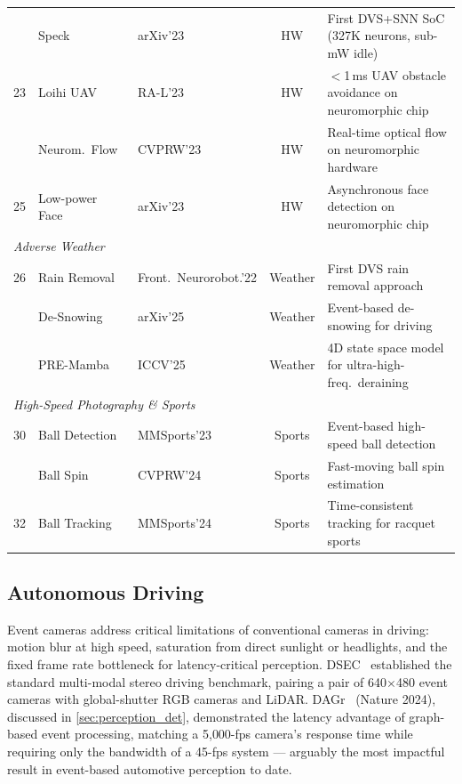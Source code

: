 \begin{table}[t]
{\begin{tabular}{rl l c l}
\midrule
\rowalt
22 & Speck~\cite{bauer2023speck} & arXiv'23 & HW & First DVS+SNN SoC (327K neurons, sub-mW idle) \\
23 & Loihi UAV~\cite{paredes2023neurochip} & RA-L'23 & HW & $<$1\,ms UAV obstacle avoidance on neuromorphic chip \\
\rowalt
24 & Neurom.~Flow~\cite{shiba2023neuromorphicof} & CVPRW'23 & HW & Real-time optical flow on neuromorphic hardware \\
25 & Low-power Face~\cite{li2023lowpowerface} & arXiv'23 & HW & Asynchronous face detection on neuromorphic chip \\
\midrule
\multicolumn{5}{l}{\textit{Adverse Weather}} \\
\midrule
26 & Rain Removal~\cite{jiang2022rainremoval} & Front.~Neurorobot.'22 & Weather & First DVS rain removal approach \\
\rowalt
28 & De-Snowing~\cite{zhang2025desnowing} & arXiv'25 & Weather & Event-based de-snowing for driving \\
\rowalt
29 & PRE-Mamba~\cite{li2025premamba} & ICCV'25 & Weather & 4D state space model for ultra-high-freq.\ deraining \\
\midrule
\multicolumn{5}{l}{\textit{High-Speed Photography \& Sports}} \\
\midrule
30 & Ball Detection~\cite{delamare2023balldetect} & MMSports'23 & Sports & Event-based high-speed ball detection \\
\rowalt
31 & Ball Spin~\cite{gao2024ballspin} & CVPRW'24 & Sports & Fast-moving ball spin estimation \\
32 & Ball Tracking~\cite{gao2024balltracking} & MMSports'24 & Sports & Time-consistent tracking for racquet sports \\
\bottomrule
\end{tabular}
}
\end{table}


\subsection{Autonomous Driving}
\label{sec:appl_driving}

Event cameras address critical limitations of conventional cameras in driving: motion blur at high speed, saturation from direct sunlight or headlights, and the fixed frame rate bottleneck for latency-critical perception. DSEC~\cite{gehrig2021dsec} established the standard multi-modal stereo driving benchmark, pairing a pair of 640$\times$480 event cameras with global-shutter RGB cameras and LiDAR. DAGr~\cite{gehrig2024dagr} (Nature 2024), discussed in \cref{sec:perception_det}, demonstrated the latency advantage of graph-based event processing, matching a 5{,}000-fps camera's response time while requiring only the bandwidth of a 45-fps system --- arguably the most impactful result in event-based automotive perception to date.

